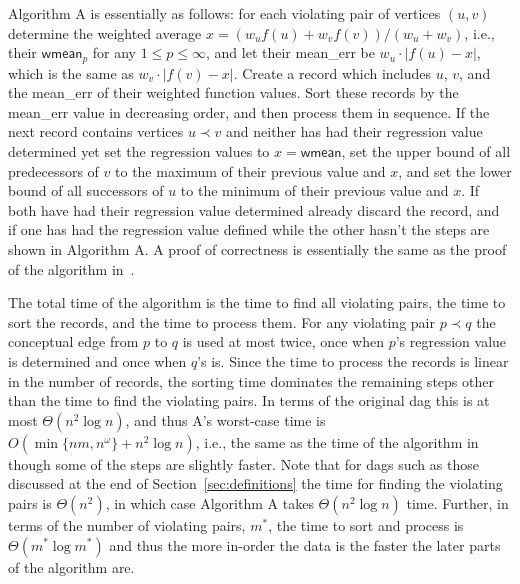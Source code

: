 \documentclass[11pt]{article}
\begin{document}
Algorithm A is essentially as follows: for each violating pair of vertices $(u,v)$ determine the weighted average $x = (w_uf(u) + w_v f(v))/(w_u+w_v)$, i.e., their $\mathsf{wmean}_p$ for any $1 \leq p \leq \infty$, and let their
{\sffamily \small mean\_err} be $w_u \!\cdot\! |f(u)-x|$, which is the same as $w_v \!\cdot\! |f(v)-x|$. 
Create a record which includes $u$, $v$, and the {\sffamily \small mean\_err} of their weighted function values.
Sort these records by the {\sffamily \small mean\_err} value in decreasing order, and then process them in sequence.
If the next record contains vertices $u \prec v$ and neither has had their regression value determined yet set the regression values to $x = \mathsf{wmean}$, set the upper bound of all predecessors of $v$ to the maximum of their previous value and $x$, and set the lower bound of all successors of $u$ to the minimum of their previous value and $x$.
If both have had their regression value determined already discard the record, and if one has had the regression value defined while the other hasn't the steps are shown in Algorithm A.
A proof of correctness is essentially the same as the proof of the algorithm in~\cite{QStrictLinfty}.

The total time of the algorithm is the time to find all violating pairs, the time to sort the records, and the time to process them.
For any violating pair $p \prec q$ the conceptual edge from $p$ to $q$ is used at most twice, once when $p$'s regression value is determined and once when $q$'s is.
Since the time to process the records is linear in the number of records, the sorting time dominates the remaining steps other than the time to find the violating pairs.
In terms of the original dag this is at most $\Theta(n^2 \log n)$, and thus A's worst-case time is $O(\min\{nm,n^\omega\} + n^2 \log n)$, i.e.,  the same as the time of the algorithm in~\cite{QStrictLinfty} though some of the steps are slightly faster.
Note that for dags such as those discussed at the end of Section~\ref{sec:definitions} the time for finding the violating pairs is $\Theta(n^2)$, in which case Algorithm A takes $\Theta(n^2 \log n)$ time.
Further, in terms of the number of violating pairs, $m^*$, the time to sort and process is $\Theta(m^*\log m^*)$ and thus the more in-order the data is the faster the later parts of the algorithm are.
\end{document}
